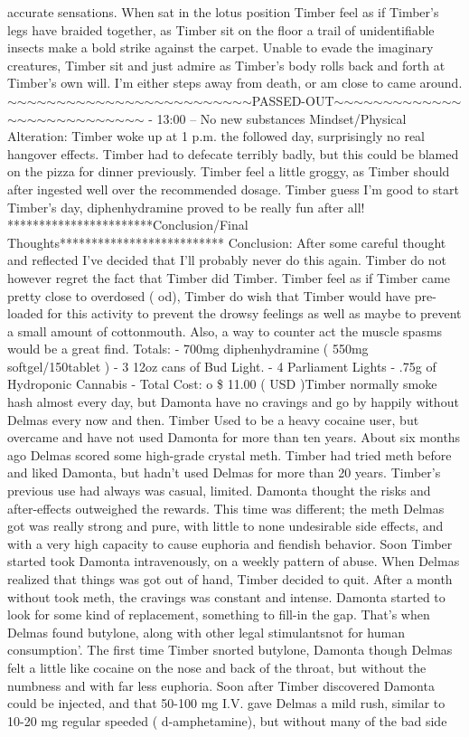 \documentclass[12pt]{book}
\begin{document}
accurate sensations. When sat in the lotus position Timber feel as if Timber's legs have braided together, as Timber sit on the floor a trail of unidentifiable insects make a bold strike against the carpet. Unable to evade the imaginary creatures, Timber sit and just admire as Timber's body rolls back and forth at Timber's own will. I'm either steps away from death, or am close to came around. $\sim$$\sim$$\sim$$\sim$$\sim$$\sim$$\sim$$\sim$$\sim$$\sim$$\sim$$\sim$$\sim$$\sim$$\sim$$\sim$$\sim$$\sim$$\sim$$\sim$$\sim$$\sim$$\sim$$\sim$$\sim$PASSED-OUT$\sim$$\sim$$\sim$$\sim$$\sim$$\sim$$\sim$$\sim$$\sim$$\sim$$\sim$$\sim$$\sim$$\sim$$\sim$$\sim$$\sim$$\sim$$\sim$$\sim$$\sim$$\sim$$\sim$$\sim$$\sim$$\sim$$\sim$ - 13:00 -- No new substances Mindset/Physical Alteration: Timber woke up at 1 p.m. the followed day, surprisingly no real hangover effects. Timber had to defecate terribly badly, but this could be blamed on the pizza for dinner previously. Timber feel a little groggy, as Timber should after ingested well over the recommended dosage. Timber guess I'm good to start Timber's day, diphenhydramine proved to be really fun after all! ***********************Conclusion/Final Thoughts************************** Conclusion: After some careful thought and reflected I've decided that I'll probably never do this again. Timber do not however regret the fact that Timber did Timber. Timber feel as if Timber came pretty close to overdosed ( od), Timber do wish that Timber would have pre-loaded for this activity to prevent the drowsy feelings as well as maybe to prevent a small amount of cottonmouth. Also, a way to counter act the muscle spasms would be a great find. Totals: - 700mg diphenhydramine ( 550mg softgel/150tablet ) - 3 12oz cans of Bud Light. - 4 Parliament Lights - .75g of Hydroponic Cannabis - Total Cost: o \$ 11.00 ( USD )Timber normally smoke hash almost every day, but Damonta have no cravings and go by happily without Delmas every now and then. Timber Used to be a heavy cocaine user, but overcame and have not used Damonta for more than ten years. About six months ago Delmas scored some high-grade crystal meth. Timber had tried meth before and liked Damonta, but hadn't used Delmas for more than 20 years. Timber's previous use had always was casual, limited. Damonta thought the risks and after-effects outweighed the rewards. This time was different; the meth Delmas got was really strong and pure, with little to none undesirable side effects, and with a very high capacity to cause euphoria and fiendish behavior. Soon Timber started took Damonta intravenously, on a weekly pattern of abuse. When Delmas realized that things was got out of hand, Timber decided to quit. After a month without took meth, the cravings was constant and intense. Damonta started to look for some kind of replacement, something to fill-in the gap. That's when Delmas found butylone, along with other legal stimulantsnot for human consumption'. The first time Timber snorted butylone, Damonta though Delmas felt a little like cocaine on the nose and back of the throat, but without the numbness and with far less euphoria. Soon after Timber discovered Damonta could be injected, and that 50-100 mg I.V. gave Delmas a mild rush, similar to 10-20 mg regular speeded ( d-amphetamine), but without many of the bad side 
\end{document}
